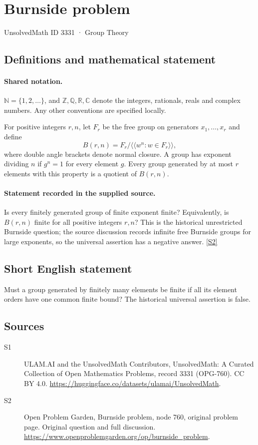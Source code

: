 \documentclass[11pt]{article}
\newcommand{\sref}[2]{\hyperlink{source:#1:#2}{[S#2]}}
\begin{document}
\setcounter{section}{3330}
\section{Burnside problem}\label{3331}
{\small\sffamily UnsolvedMath ID 3331 · Group Theory}
\subsection{Definitions and mathematical statement}

\paragraph{Shared notation.}$\mathbb N=\{1,2,\ldots\}$, and $\mathbb Z,\mathbb Q,\mathbb R,\mathbb C$ denote the integers, rationals, reals and complex numbers. Any other conventions are specified locally.


For positive integers $r,n$, let $F_r$ be the free group on generators $x_1,\ldots,x_r$ and define\[ B(r,n)=F_r/\langle\!\langle w^n:w\in F_r\rangle\!\rangle, \] where double angle brackets denote normal closure. A group has exponent dividing $n$ if $g^n=1$ for every element $g$. Every group generated by at most $r$ elements with this property is a quotient of $B(r,n)$.
\paragraph{Statement recorded in the supplied source.}
Is every finitely generated group of finite exponent finite? Equivalently, is $B(r,n)$ finite for all positive integers $r,n$? This is the historical unrestricted Burnside question; the source discussion records infinite free Burnside groups for large exponents, so the universal assertion has a negative answer. \sref{3331}{2}
\subsection{Short English statement}
Must a group generated by finitely many elements be finite if all its element orders have one common finite bound? The historical universal assertion is false.
\subsection{Sources}
\begin{description}
\item[\hypertarget{source:3331:1}{S1}] ULAM.AI and the UnsolvedMath Contributors, UnsolvedMath: A Curated Collection of Open Mathematics Problems, record 3331 (OPG-760). CC BY 4.0. \url{https://huggingface.co/datasets/ulamai/UnsolvedMath}.
\item[\hypertarget{source:3331:2}{S2}] Open Problem Garden, Burnside problem, node 760, original problem page. Original question and full discussion. \url{https://www.openproblemgarden.org/op/burnside_problem}.

\end{description}
\label{end:3331}
\end{document}
